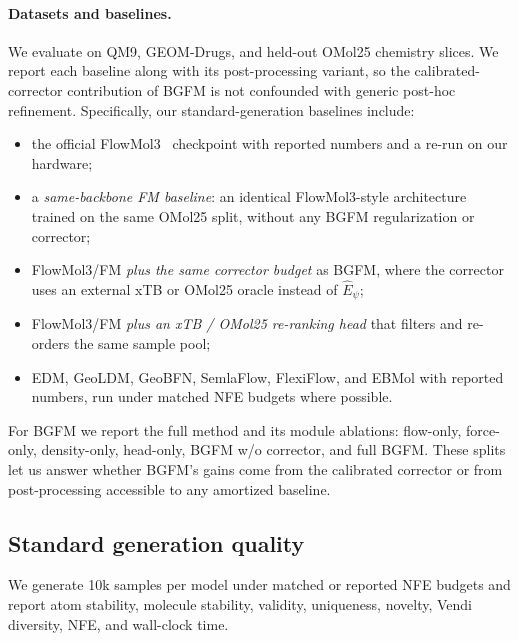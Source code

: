 \documentclass{article}
\begin{document}
\paragraph{Datasets and baselines.}
We evaluate on QM9, GEOM-Drugs, and held-out OMol25 chemistry slices.
We report each baseline along with its post-processing variant, so the
calibrated-corrector contribution of BGFM is not confounded with
generic post-hoc refinement. Specifically, our standard-generation
baselines include:
\begin{itemize}
    \item the official FlowMol3~\citep{flowmol3} checkpoint with reported numbers and a re-run on our hardware;
    \item a \emph{same-backbone FM baseline}: an identical FlowMol3-style architecture trained on the same OMol25 split, without any BGFM regularization or corrector;
    \item FlowMol3/FM \emph{plus the same corrector budget} as BGFM, where the corrector uses an external xTB or OMol25 oracle instead of $\hat E_\psi$;
    \item FlowMol3/FM \emph{plus an xTB / OMol25 re-ranking head} that filters and re-orders the same sample pool;
    \item EDM, GeoLDM, GeoBFN, SemlaFlow, FlexiFlow, and EBMol with reported numbers, run under matched NFE budgets where possible.
\end{itemize}
For BGFM we report the full method and its module ablations: flow-only,
force-only, density-only, head-only, BGFM w/o corrector, and full BGFM.
These splits let us answer whether BGFM's gains come from the
calibrated corrector or from post-processing accessible to any
amortized baseline.

\subsection{Standard generation quality}

We generate 10k samples per model under matched or reported NFE budgets
and report atom stability, molecule stability, validity, uniqueness,
novelty, Vendi diversity, NFE, and wall-clock time.
\end{document}
